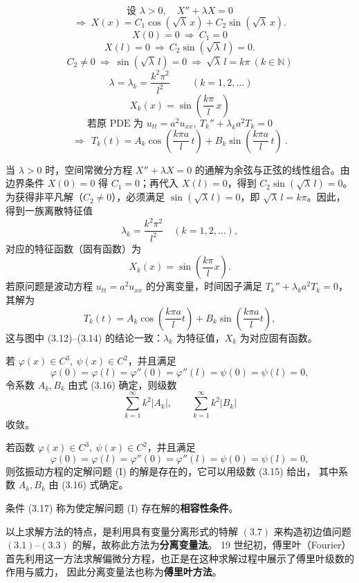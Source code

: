 \begin{dxsolution}[情形 C：$\lambda>0$]

\[
\text{设 }\lambda>0,\quad
X''+\lambda X=0
\]
\[
\Rightarrow\;
X(x)=C_1\cos(\sqrt{\lambda}\,x)+C_2\sin(\sqrt{\lambda}\,x).
\]
\[
X(0)=0\ \Rightarrow\ C_1=0
\]
\[
X(l)=0\ \Rightarrow\ C_2\sin(\sqrt{\lambda}\,l)=0.
\]
\[
C_2\neq 0\ \Rightarrow\ \sin(\sqrt{\lambda}\,l)=0
\ \Rightarrow\ \sqrt{\lambda}\,l=k\pi\ (k\in\mathbb{N})
\]
\[
\boxed{\ \lambda=\lambda_k=\dfrac{k^2\pi^2}{l^2}\ }\qquad(k=1,2,\dots)
\]
\[
\boxed{\ X_k(x)=\sin\!\left(\dfrac{k\pi}{l}\,x\right)\ }
\]
\[
\text{若原 PDE 为 }u_{tt}=a^2u_{xx},\
T_k''+\lambda_k a^2 T_k=0
\]
\[
\Rightarrow\
\boxed{\ T_k(t)=A_k\cos\!\left(\dfrac{k\pi a}{l}\,t\right)
      +B_k\sin\!\left(\dfrac{k\pi a}{l}\,t\right)\ }.
\]

\tcblower

当 $\lambda>0$ 时，空间常微分方程 $X''+\lambda X=0$ 的通解为余弦与正弦的线性组合。由边界条件 $X(0)=0$ 得 $C_1=0$；再代入 $X(l)=0$，得到 $C_2\sin(\sqrt{\lambda}\,l)=0$。为获得非平凡解（$C_2\neq0$），必须满足 $\sin(\sqrt{\lambda}\,l)=0$，即 $\sqrt{\lambda}\,l=k\pi$。因此，得到一族离散特征值
\[
\lambda_k=\frac{k^2\pi^2}{l^2}\quad(k=1,2,\ldots),
\]
对应的特征函数（固有函数）为
\[
X_k(x)=\sin\!\left(\frac{k\pi}{l}x\right).
\]
若原问题是波动方程 $u_{tt}=a^2u_{xx}$ 的分离变量，时间因子满足
$T_k''+\lambda_k a^2 T_k=0$，其解为
\[
T_k(t)=A_k\cos\!\left(\frac{k\pi a}{l}t\right)
      +B_k\sin\!\left(\frac{k\pi a}{l}t\right),
\]
这与图中 (3.12)–(3.14) 的结论一致：$\lambda_k$ 为特征值，$X_k$ 为对应固有函数。
\end{dxsolution}
\begin{theorem}[引理 3.1]
若 \(\varphi(x)\in C^3,\ \psi(x)\in C^2\)，并且满足
\[
\varphi(0)=\varphi(l)=\varphi''(0)=\varphi''(l)=\psi(0)=\psi(l)=0,
\]
令系数 \(A_k,B_k\) 由式 (3.16) 确定，则级数
\[
\sum_{k=1}^{\infty} k^2 |A_k|,\qquad
\sum_{k=1}^{\infty} k^2 |B_k|
\]
收敛。
\end{theorem}
\begin{theorem}[定理 3.1]
若函数 \(\varphi(x)\in C^3,\ \psi(x)\in C^2\)，并且满足
\[
\varphi(0)=\varphi(l)=\varphi''(0)=\varphi''(l)=\psi(0)=\psi(l)=0, \tag{3.17}
\]
则弦振动方程的定解问题 (I) 的解是存在的，它可以用级数 (3.15) 给出，
其中系数 \(A_k,B_k\) 由 (3.16) 式确定。

条件 (3.17) 称为使定解问题 (I) 存在解的\textbf{相容性条件}。
\end{theorem}
\begin{proposition}
以上求解方法的特点，是利用具有变量分离形式的特解 \((3.7)\) 来构造初边值问题 \((3.1)\)–\((3.3)\) 的解，故称此方法为\textbf{分离变量法}。  
19 世纪初，傅里叶（Fourier）首先利用这一方法求解偏微分方程，也正是在这种求解过程中展示了傅里叶级数的作用与威力，  
因此分离变量法也称为\textbf{傅里叶方法}。
\end{proposition}
